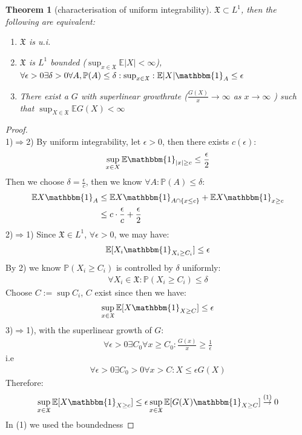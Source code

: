 \documentclass[a4paper,11pt]{book}
\newtheorem{theorem}{Theorem}[section]
\theoremstyle{definition}
\theoremstyle{remark}
\begin{document}
\begin{theorem}[characterisation of uniform integrability]
	$\mathfrak{X} \subset L^1$, then the following are equivalent:
	\begin{enumerate}
		\item $\mathfrak{X}$ is u.i.
		\item $\mathfrak{X}$ is $L^1$ bounded ($\sup_{x \in \mathfrak{X}}\mathbb{E}|X| < \infty$), $\forall \epsilon > 0 \exists \delta > 0\forall A, \mathbb{P}(A) \leq \delta:\sup_{x \in \mathfrak{X}}: \mathbb{E}|X|\mathbbm{1}_A \leq \epsilon$

		\item There exist a $G$ with superlinear growthrate ($\frac{G(X)}{x} \rightarrow \infty$ as $x \rightarrow \infty$ ) such that $\sup_{X \in \mathfrak{X}} \mathbb{E}G(X) < \infty$
	\end{enumerate}
\end{theorem}
\begin{proof}\quad\\
1)$\Rightarrow$2)
	By uniform integrability, let $\epsilon > 0$, then there exists $c(\epsilon)$:
	\begin{align*}
		\sup_{x \in X} \mathbb{E}\mathbbm{1}_{|x| \geq c} \le \frac{\epsilon}{2}
	\end{align*}
	Then we choose $\delta = \frac{\epsilon}{c}$, then we know $\forall A : \mathbb{P}( A) \leq \delta$: 
	\begin{align*}
		\mathbb{E}X\mathbbm{1}_A &\leq \mathbb{E} X \mathbbm{1}_{A \cap \{x \leq c\}} + \mathbb{E}X\mathbbm{1}_{x \geq c}\\
		&\leq c \cdot \frac{\epsilon}{c} +  \frac{\epsilon}{2}
	\end{align*}
	2)$\Rightarrow$1)\label{Q} Since $\mathfrak{X} \in L^1$, $\forall \epsilon >0$, we may have:
	\begin{align*}
		\mathbb{E}[X_i \mathbbm{1}_{X_i \geq C_i}] \leq \epsilon
	\end{align*}
	By 2) we know $\mathbb{P}(X_i \geq C_i)$ is controlled by $\delta$ uniformly:
	\begin{align*}
		\forall X_i \in \mathfrak{X}: \mathbb{P}(X_i \geq C_i) \leq \delta
	\end{align*}
	Choose $C:= \sup C_i$, $C$ exist since then we have:
	\begin{align*}
		\sup_{x \in \mathfrak{X}} \mathbb{E}[X\mathbbm{1}_{X \geq C}] \leq
		 \epsilon
	\end{align*}
	3)$\Rightarrow$1), with the superlinear growth of $G$:
	\begin{align*}
		\forall \epsilon > 0 \exists C_0 \forall x \geq C_0:\frac{G(x)}{x} \geq \frac{1}{\epsilon} 
	\end{align*}
	i.e
	\begin{align*}
		\forall \epsilon > 0 \exists C_0> 0 \forall x > C: X \leq \epsilon G(X)
	\end{align*}
	Therefore:
	\begin{align*}
		\sup_{x \in \mathfrak{X}} \mathbb{E}[X\mathbbm{1}_{X \geq c}] \leq \epsilon \sup_{x \in \mathfrak{X}} \mathbb{E}[G(X)\mathbbm{1}_{X \geq C}] \overset{(1)}{\rightarrow}0
	\end{align*}
	In (1) we used the boundedness
\end{proof}
\end{document}
